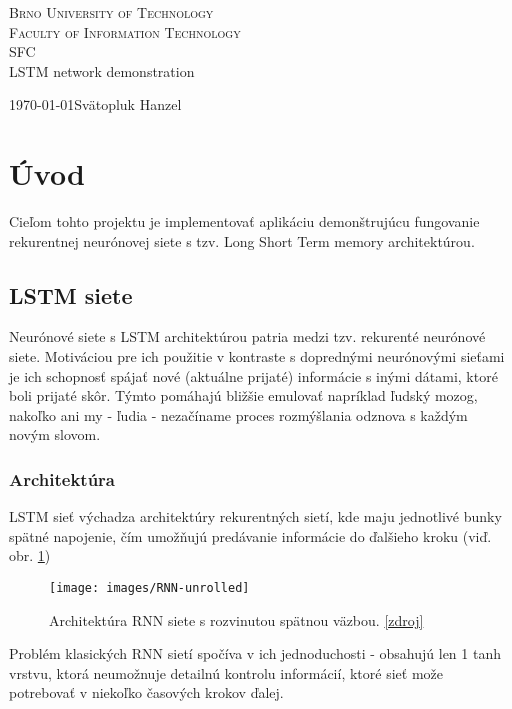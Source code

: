 \documentclass[12pt,a4paper]{article}
\begin{document}
\begin{titlepage}
	\begin{center}
	    {\LARGE\textsc{Brno University of Technology}}\\
	    \smallskip
	    {\Large\textsc{Faculty of Information Technology}}\\
	    \bigskip
	    \smallskip
		\Huge{SFC}\\
		\huge{LSTM network demonstration}
	\end{center}
    {\today \hfill Svätopluk Hanzel}
\end{titlepage}

\newpage
\section{Úvod}
	Cieľom tohto projektu je implementovať aplikáciu demonštrujúcu fungovanie rekurentnej neurónovej siete s tzv. Long Short Term memory architektúrou. 

	\subsection{LSTM siete}
	Neurónové siete s LSTM architektúrou patria medzi tzv. rekurenté neurónové siete. Motiváciou pre ich použitie v kontraste s doprednými neurónovými sieťami je ich schopnosť spájať nové (aktuálne prijaté) informácie s inými dátami, ktoré boli prijaté skôr. Týmto pomáhajú bližšie emulovať napríklad ľudský mozog, nakoľko ani my - ľudia - nezačíname proces rozmýšlania odznova s každým novým slovom.
	
		\subsubsection{Architektúra}
			LSTM sieť výchadza architektúry rekurentných sietí, kde maju jednotlivé bunky spätné napojenie, čím umožňujú predávanie informácie do ďalšieho kroku (viď. obr. \ref{fig:rnn-unrolled})
			\begin{figure}[h]
				\centering
				\texttt{[image: images/RNN-unrolled]}
				\caption{Architektúra RNN siete s rozvinutou spätnou väzbou. \href{https://colah.github.io/posts/2015-08-Understanding-LSTMs/}{[zdroj]}}
				\label{fig:rnn-unrolled}
			\end{figure}
			Problém klasických RNN sietí spočíva v ich jednoduchosti - obsahujú len 1 tanh vrstvu, ktorá neumožnuje detailnú kontrolu informácií, ktoré sieť može potrebovať v niekoľko časových krokov ďalej.
			
\end{document}
